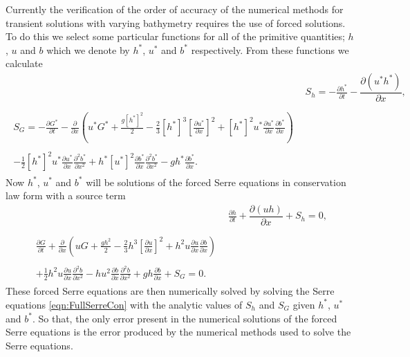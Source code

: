 Currently the verification of the order of accuracy of the numerical methods for transient solutions with varying bathymetry requires the use of forced solutions. To do this we select some particular functions for all of the primitive quantities; $h$, $u$ and $b$ which we denote by $h^*$, $u^*$ and $b^*$ respectively. From these functions we calculate 
\begin{align*}
&  S_{h} = -\frac{\partial h^*}{\partial t} - \dfrac{\partial (u^*h^*)}{\partial x} ,  \\ \nonumber \\
\begin{split}
S_{G} = -\frac{\partial G^*}{\partial t}  - \frac{\partial}{\partial x} \left( {u}^* G^* + \frac{g\left[h^*\right]^2}{2} - \frac{2}{3}\left[h^*\right]^3 \left[\frac{\partial {u}^*}{\partial x}\right]^2 + \left[h^*\right]^2 {u^*}\frac{\partial {u}^*}{\partial x}\frac{\partial b^*}{\partial x} \right) \\ \\ - \frac{1}{2}\left[h^*\right]^2 {u}^* \frac{\partial {u}^*}{\partial x} \frac{\partial^2 b^*}{\partial x^2}  + h^* {\left[u^*\right]}^2\frac{\partial b^*}{\partial x}\frac{\partial^2 b^*}{\partial x^2} - gh^*\frac{\partial b^*}{\partial x}.
\end{split}
\end{align*} 
Now $h^*$, $u^*$ and $b^*$ will be solutions of the forced Serre equations in conservation law form with a source term
\begin{subequations}
	\label{eqn:FullSerreConForced}
	\begin{align}
	& \frac{\partial h}{\partial t} + \dfrac{\partial (uh)}{\partial x} + S_{h}  = 0 ,\label{eqn:FullSerreConMassForced}  \\ \nonumber \\
	\begin{split}
	\label{eqn:SerreconsconmomForced}
	\frac{\partial G}{\partial t}  + \frac{\partial}{\partial x} \left( {u} G + \frac{gh^2}{2} - \frac{2}{3}h^3 \left[ \frac{\partial {u}}{\partial x} \right]^2 + h^2 {u}\frac{\partial {u}}{\partial x}\frac{\partial b}{\partial x} \right) \\ \\ + \frac{1}{2}h^2 {u} \frac{\partial {u}}{\partial x} \frac{\partial^2 b}{\partial x^2}  - h {u}^2\frac{\partial b}{\partial x}\frac{\partial^2 b}{\partial x^2} + gh\frac{\partial b}{\partial x} + S_{G} = 0.
	\end{split}
	\end{align}
\end{subequations}
These forced Serre equations are then numerically solved by solving the Serre equations \eqref{eqn:FullSerreCon} with the analytic values of $S_{h}$ and $S_{G}$ given $h^*$, $u^*$ and $b^*$. So that, the only error present in the numerical solutions of the forced Serre equations is the error produced by the numerical methods used to solve the Serre equations. 

